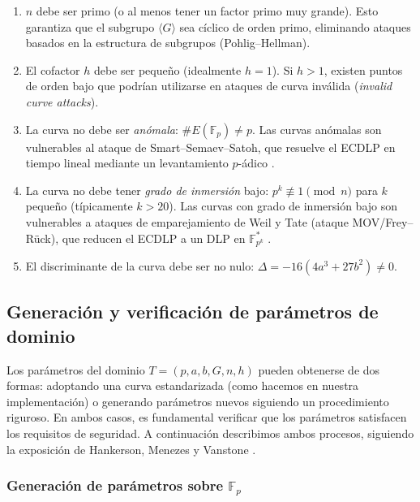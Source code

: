 \begin{enumerate}
    \item $n$ debe ser primo (o al menos tener un factor primo muy grande). Esto garantiza que el subgrupo $\langle G \rangle$ sea cíclico de orden primo, eliminando ataques basados en la estructura de subgrupos (Pohlig--Hellman).
    \item El cofactor $h$ debe ser pequeño (idealmente $h = 1$). Si $h > 1$, existen puntos de orden bajo que podrían utilizarse en ataques de curva inválida (\textit{invalid curve attacks}).
    \item La curva no debe ser \emph{anómala}: $\#E(\mathbb{F}_p) \neq p$. Las curvas anómalas son vulnerables al ataque de Smart--Semaev--Satoh, que resuelve el ECDLP en tiempo lineal mediante un levantamiento $p$-ádico \cite{smart1999anomalous}.
    \item La curva no debe tener \emph{grado de inmersión} bajo: $p^k \not\equiv 1 \pmod{n}$ para $k$ pequeño (típicamente $k > 20$). Las curvas con grado de inmersión bajo son vulnerables a ataques de emparejamiento de Weil y Tate (ataque MOV/Frey--Rück), que reducen el ECDLP a un DLP en $\mathbb{F}_{p^k}^*$ \cite{menezes1993reducing}.
    \item El discriminante de la curva debe ser no nulo: $\Delta = -16(4a^3 + 27b^2) \neq 0$.
\end{enumerate}

\subsection{Generación y verificación de parámetros de dominio}
\label{subsec:ecc-gen-verificacion-params}

Los parámetros del dominio $T = (p, a, b, G, n, h)$ pueden obtenerse de dos formas: adoptando una curva estandarizada (como hacemos en nuestra implementación) o generando parámetros nuevos siguiendo un procedimiento riguroso. En ambos casos, es fundamental verificar que los parámetros satisfacen los requisitos de seguridad. A continuación describimos ambos procesos, siguiendo la exposición de Hankerson, Menezes y Vanstone \cite{hankerson2004guide}.

\subsubsection{\texorpdfstring{Generación de parámetros sobre $\mathbb{F}_p$}{Generacion de parametros sobre Fp}}
\label{subsubsec:gen-params-fp}


